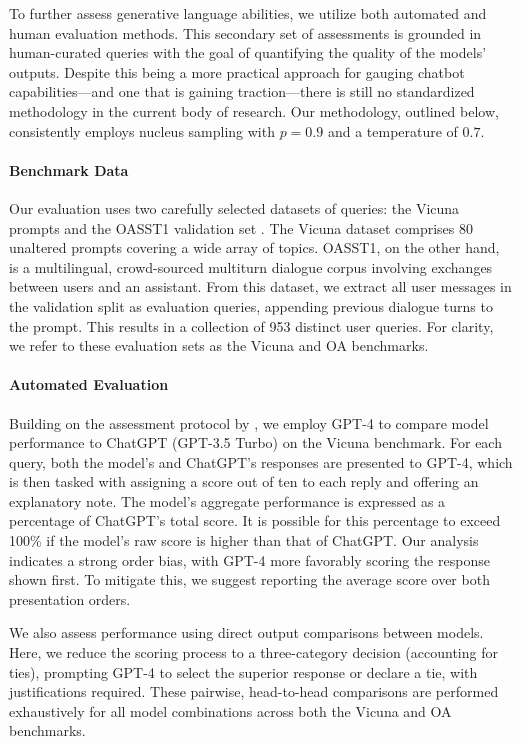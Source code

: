 To further assess generative language abilities, we utilize both automated and human evaluation methods. This secondary set of assessments is grounded in human-curated queries with the goal of quantifying the quality of the models’ outputs. Despite this being a more practical approach for gauging chatbot capabilities—and one that is gaining traction—there is still no standardized methodology in the current body of research. Our methodology, outlined below, consistently employs nucleus sampling with $p=0.9$ and a temperature of $0.7$.

\paragraph{Benchmark Data} Our evaluation uses two carefully selected datasets of queries: the Vicuna prompts \citep{vicuna2023} and the OASST1 validation set \citep{kopf2023openassistant}. The Vicuna dataset comprises 80 unaltered prompts covering a wide array of topics. OASST1, on the other hand, is a multilingual, crowd-sourced multiturn dialogue corpus involving exchanges between users and an assistant. From this dataset, we extract all user messages in the validation split as evaluation queries, appending previous dialogue turns to the prompt. This results in a collection of 953 distinct user queries. For clarity, we refer to these evaluation sets as the Vicuna and OA benchmarks.

\paragraph{Automated Evaluation} Building on the assessment protocol by \citet{vicuna2023}, we employ GPT-4 to compare model performance to ChatGPT (GPT-3.5 Turbo) on the Vicuna benchmark. For each query, both the model’s and ChatGPT’s responses are presented to GPT-4, which is then tasked with assigning a score out of ten to each reply and offering an explanatory note. The model’s aggregate performance is expressed as a percentage of ChatGPT’s total score. It is possible for this percentage to exceed 100\% if the model’s raw score is higher than that of ChatGPT. Our analysis indicates a strong order bias, with GPT-4 more favorably scoring the response shown first. To mitigate this, we suggest reporting the average score over both presentation orders.

We also assess performance using direct output comparisons between models. Here, we reduce the scoring process to a three-category decision (accounting for ties), prompting GPT-4 to select the superior response or declare a tie, with justifications required. These pairwise, head-to-head comparisons are performed exhaustively for all model combinations across both the Vicuna and OA benchmarks.

